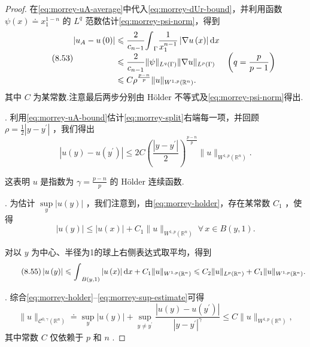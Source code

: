 \begin{proof}
在\eqref{eq:morrey-uA-average}中代入\eqref{eq:morrey-dUr-bound}，并利用函数 $\psi \left( x\right)  \doteq  {x}_{1}^{1 - n}$ 的 ${L}^{q}$ 范数估计\eqref{eq:morrey-psi-norm}，得到
\begin{equation}\tag{8.53}\label{eq:morrey-uA-bound}
    {\setjot[0]\begin{aligned}
        \left| {{u}_{A} - u\left( 0\right) }\right|  &\leq  \frac{2}{{c}_{n - 1}}{\int }_{\Gamma }\frac{1}{{x}_{1}^{n - 1}}\left| {\nabla u\left( x\right) }\right| {\d x}\\
        &\leq  \frac{2}{{c}_{n - 1}}\| \psi {\| }_{{L}^{q}\left( \Gamma \right) }\| \nabla u{\| }_{{L}^{p}\left( \Gamma \right) }\;\quad \left( {q = \frac{p}{p - 1}}\right)\\
        &\leq  C{\rho }^{\frac{p - n}{p}}\| u{\| }_{{W}^{1,p}\left( {\mathbb{R}}^{n}\right) }.
    \end{aligned}}
\end{equation}
其中 $C$ 为某常数.注意最后两步分别由 Hölder 不等式及\eqref{eq:morrey-psi-norm}得出.

. 利用\eqref{eq:morrey-uA-bound}估计\eqref{eq:morrey-split}右端每一项，并回顾 $\rho  = \frac{1}{2}\left| {y - {y}^{\prime }}\right|$ ，我们得出
\begin{equation}\tag{8.54}\label{eq:morrey-holder}
\left| {u\left( y\right)  - u\left( {y}^{\prime }\right) }\right|  \leq  {2C}{\left( \frac{\left| y - {y}^{\prime }\right| }{2}\right) }^{\frac{p - n}{p}}\| u{\| }_{{W}^{1,p}\left( {\mathbb{R}}^{n}\right) }.
\end{equation}

这表明 $u$ 是指数为 $\gamma  = \frac{p - n}{p}$ 的 Hölder 连续函数.

. 为估计 $\mathop{\sup }\limits_{y}\left| {u\left( y\right) }\right|$ ，我们注意到，由\eqref{eq:morrey-holder}，存在某常数 ${C}_{1}$ ，使得
\[
\left| {u\left( y\right) }\right|  \leq  \left| {u\left( x\right) }\right|  + {C}_{1}\| u{\| }_{{W}^{1,p}\left( {\mathbb{R}}^{n}\right) }\;\forall\,x \in  B\left( {y,1}\right) .
\]

对以 $y$ 为中心、半径为1的球上右侧表达式取平均，得到
\begin{equation}\tag{8.55}\label{eq:morrey-sup-estimate}
\left| {u\left( y\right) }\right|  \leqslant  {\int }_{B\left( {y,1}\right) }\left| {u\left( x\right) }\right| {\mathop{}\!\mathrm{d} x} + {C}_{1}\| u{\| }_{{W}^{1,p}\left( {\mathbb{R}}^{n}\right) } \leqslant  {C}_{2}\| u{\| }_{{L}^{p}\left( {\mathbb{R}}^{n}\right) } + {C}_{1}\| u{\| }_{{W}^{1,p}\left( {\mathbb{R}}^{n}\right) }.
\end{equation}

. 综合\eqref{eq:morrey-holder}--\eqref{eq:morrey-sup-estimate}可得
\[
\| u{\| }_{{\mathcal{C}}^{0,\gamma }\left( {\mathbb{R}}^{n}\right) } \doteq  \mathop{\sup }\limits_{y}\left| {u\left( y\right) }\right|  + \mathop{\sup }\limits_{{y \neq  {y}^{\prime }}}\frac{\left| u\left( y\right)  - u\left( {y}^{\prime }\right) \right| }{{\left| y - {y}^{\prime }\right| }^{\gamma }} \leq  C\| u{\| }_{{W}^{1,p}\left( {\mathbb{R}}^{n}\right) },
\]
其中常数 $C$ 仅依赖于 $p$ 和 $n$ .
\end{proof}

